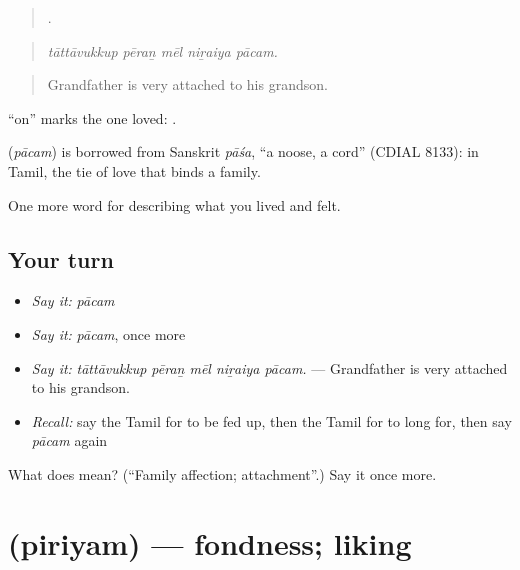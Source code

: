 \begin{quote}
    .
\end{quote}

\begin{quote}
\emph{tāttāvukkup pēraṉ mēl niṟaiya pācam.}
\end{quote}

\begin{quote}
Grandfather is very attached to his grandson.
\end{quote}

 \textquotedblleft{}on\textquotedblright{} marks the one loved:   .

\begin{cousinweb}
\textbf{} (\emph{pācam}) is borrowed from Sanskrit \emph{pāśa}, \textquotedblleft{}a noose, a cord\textquotedblright{} (CDIAL 8133): in Tamil, the tie of love that binds a family.
\end{cousinweb}

\begin{grammarlens}[title={What you've built}]
One more word for describing what you lived and felt.
\end{grammarlens}

\subsection*{Your turn}
\begin{itemize}
\raggedright
  \item \emph{Say it:} \emph{pācam}
  \item \emph{Say it:} \emph{pācam}, once more
  \item \emph{Say it:} \emph{tāttāvukkup pēraṉ mēl niṟaiya pācam.} — Grandfather is very attached to his grandson.
  \item \emph{Recall:} say the Tamil for to be fed up, then the Tamil for to long for, then say \emph{pācam} again
\end{itemize}

\begin{tcolorbox}[breakable,colback=teal!4,colframe=teal!35!black,title={Before you move on}]
What does  mean? (\textquotedblleft{}Family affection; attachment\textquotedblright{}.) Say it once more.
\end{tcolorbox}
\section[\texorpdfstring{\ta{பிரியம்} (piriyam)}{பிரியம் (piriyam)}]{ (piriyam) — fondness; liking}

